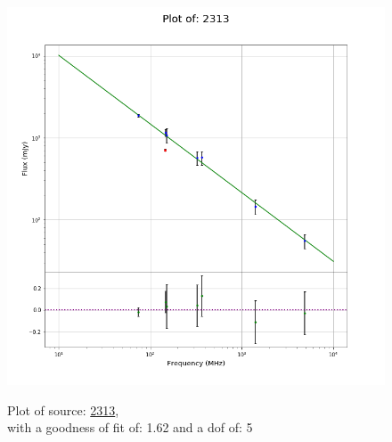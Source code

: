 \documentclass{article}
\begin{document}
\begin{figure}[H]
\begin{minipage}{0.5\textwidth}
        \includegraphics[scale = 0.35]{KmeulenTrap4P23_1hr/1hr2313.png}
        \captionsetup{labelformat=empty}
        \caption{Plot of source: \href{http://banana.transientskp.org/r4/vlo_KmeulenTrap4P23/runningcatalog/2313}{2313},\\with a goodness of fit of: 1.62 and a dof of: 5}
    \addtocounter{figure}{-1}
    \label{KmeulenTrap4P23:1hr:2313:plot}
    \end{minipage}
\end{figure}
\end{document}
